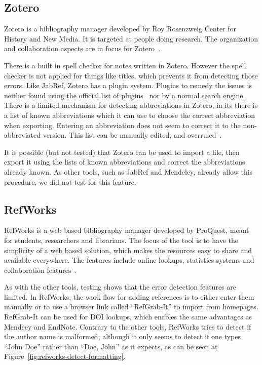 \subsection{Zotero}

Zotero is a bibliography manager developed by Roy Rosenzweig Center
for History and New Media.  It is targeted at people doing research.
The organization and collaboration aspects are in focus for
Zotero~\cite{zotero_features}.

There is a built in spell checker for notes written in Zotero.
However the spell checker is not applied for things like titles, which
prevents it from detecting those errors.  Like JabRef, Zotero has a
plugin system.  Plugins to remedy the {\bibtex} issues is neither
found using the official list of plugins~\cite{zotero_plugins} nor by
a normal search engine. There is a limited mechanism for detecting
abbreviations in Zotero, in its  there is a list of known
abbreviations which it can use to choose the correct abbreviation when
exporting.  Entering an abbreviation does not seem to correct it to
the non-abbreviated version.  This list can be manually edited, and
overruled~\cite{zotero_abbreviations}.

It is possible (but not tested) that Zotero can be used to import a
{\bibtex} file, then export it using the lists of known abbreviations
and correct the abbreviations already known.  As other tools, such as
JabRef and Mendeley, already allow this procedure, we did not test for
this feature.


\subsection{RefWorks}
RefWorks is a web based bibliography manager developed by ProQuest,
meant for students, researchers and librarians.  The focus of the tool
is to have the simplicity of a web based solution, which makes the
resources easy to share and available everywhere.  The features
include online lookups, statistics systems and collaboration
features~\cite{refworks_features}.

As with the other tools, testing shows that the error detection
features are limited.  In RefWorks, the work flow for adding
references is to either enter them manually or to use a browser link
called ``RefGrab-It'' to import from homepages.  RefGrab-It can be
used for DOI lookups, which enables the same advantages as Mendeey and
EndNote.  Contrary to the other tools, RefWorks tries to detect if the
author name is malformed, although it only seems to detect if one
types ``John Doe'' rather than ``Doe, John'' as it expects, as can be
seen at Figure~\ref{fig:refworks-detect-formatting}.

